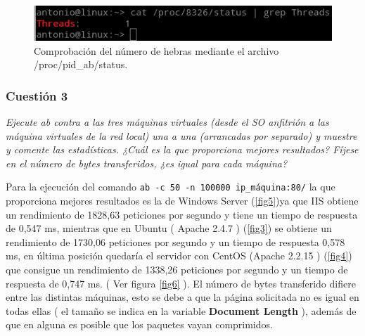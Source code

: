 \begin{figure}[H]
  \begin{center}
    \includegraphics[width=1\textwidth]{imagenes/ab2}
    \caption{Comprobación del número de hebras mediante el archivo /proc/pid\_ab/status.}
    \label{fig12}
  \end{center}
\end{figure}


\subsubsection{Cuestión 3}
\textit{Ejecute ab contra a las tres máquinas virtuales (desde el SO anfitrión a las máquina virtuales de la red local) una a una (arrancadas por separado) y muestre y comente las estadísticas. ¿Cuál es la que proporciona mejores resultados? Fíjese en el número de bytes transferidos, ¿es igual para cada máquina?}
\newline

Para la ejecución del comando \texttt{ab -c 50 -n 100000 ip\_máquina:80/} la que proporciona mejores resultados es la de Windows Server (\cref{fig5})ya que IIS obtiene un rendimiento de 1828,63 peticiones por segundo y tiene un tiempo de respuesta de 0,547 ms, mientras que en Ubuntu ( Apache 2.4.7 ) (\cref{fig3}) se obtiene un rendimiento de 1730,06 peticiones por segundo y un tiempo de respuesta 0,578 ms, en última posición quedaría el servidor con CentOS (Apache 2.2.15 ) (\cref{fig4})  que consigue un rendimiento de 1338,26 peticiones por segundo y un tiempo de respuesta de 0,747 ms.\cite{ab} ( Ver figura \ref{fig6} ). El número de bytes transferido difiere entre las distintas máquinas, esto se debe a que la página solicitada no es igual en todas ellas ( el tamaño se indica en la variable \textbf{Document Length} ), además de que en alguna es posible que los paquetes vayan comprimidos.

